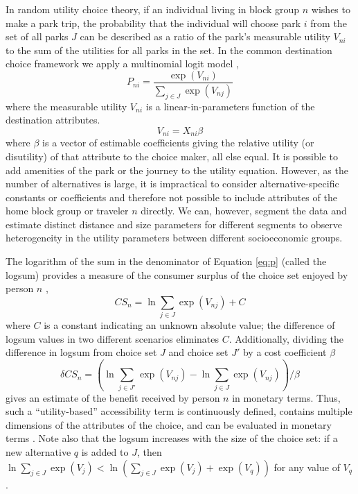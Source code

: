 \documentclass[3p, authoryear, review]{elsarticle} %
\begin{document}
In random utility choice theory, if an individual living in block group \(n\)
wishes to make a park trip, the probability that the individual will choose park
\(i\) from the set of all parks \(J\) can be described as a ratio of the park's
measurable utility \(V_{ni}\) to the sum of the utilities for all parks in the
set. In the common destination choice framework we apply a multinomial logit
model \citep{McFadden1974, Recker1978},
\begin{equation}\label{eq:p}
   P_{ni} = \frac{\exp(V_{ni})}{\sum_{j \in J}\exp(V_{nj})}
\end{equation}
where the measurable utility \(V_{ni}\) is a linear-in-parameters function of
the destination attributes.
\begin{equation}\label{eq:V}
V_{ni} = X_{ni}\beta
\end{equation}
where \(\beta\) is a vector of estimable coefficients giving the relative utility
(or disutility) of that attribute to the choice maker, all else equal. It is
possible to add amenities of the park or the journey to the utility equation.
However, as the number of alternatives is large, it is impractical to consider
alternative-specific constants or coefficients and therefore not possible to
include attributes of the home block group or traveler \(n\) directly. We can,
however, segment the data and estimate distinct distance and size parameters
for different segments to observe heterogeneity in the utility parameters
between different socioeconomic groups.

The logarithm of the sum in the denominator of Equation \ref{eq:p} (called the
logsum) provides a measure of the consumer surplus of the choice set enjoyed by
person \(n\) \citep{Williams1977a},
\begin{equation}
CS_n = \ln{{\sum_{j \in J}\exp(V_{nj})}} + C
  \label{eq:logsum}
\end{equation}
where \(C\) is a constant indicating an unknown absolute value; the difference of
logsum values in two different scenarios eliminates \(C\). Additionally, dividing
the difference in logsum from choice set \(J\) and choice set \(J'\) by a cost
coefficient \(\beta\)
\begin{equation}
\delta CS_n = (\ln{\sum_{j \in J'}\exp(V_{nj})} - \ln{\sum_{j \in J}\exp(V_{nj})})/\beta
  \label{eq:deltalogsum}
\end{equation}
gives an estimate of the benefit received by person \(n\) in monetary terms. Thus,
such a ``utility-based'' accessibility term is continuously defined, contains
multiple dimensions of the attributes of the choice, and can be evaluated in
monetary terms \citep{Handy1997, Dong2006}. Note also that the logsum increases
with the size of the choice set: if a new alternative \(q\) is added to \(J\), then
\(\ln\sum_{j\in J}\exp(V_j) < \ln(\sum_{j\in J}\exp(V_j) + \exp(V_q))\) for
any value of \(V_q\).
\end{document}
